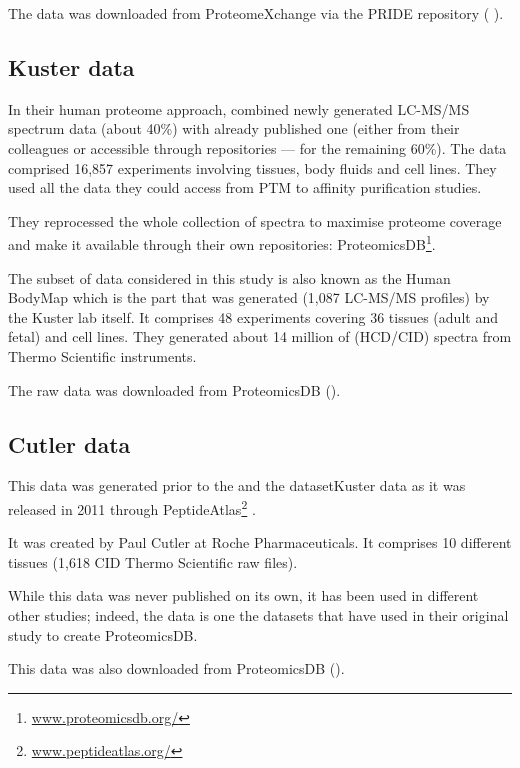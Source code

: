 The data was downloaded from ProteomeXchange via the PRIDE repository (%
).

\subsection{Kuster data}

In their human proteome approach,
\cite{KusterData} combined newly generated \gls{LC-MS/MS} spectrum
data (about 40\%) with already published one
(either from their colleagues or accessible through repositories ---
for the remaining 60\%).
The data comprised 16,857 experiments involving tissues, body fluids and cell
lines. They used all the data they could access from \gls{PTM} to affinity
purification studies.

They reprocessed the whole collection of spectra to maximise proteome coverage
and make it available through their own repositories: ProteomicsDB\footnote{%
\href{https://www.proteomicsdb.org/}{www.proteomicsdb.org/}}.

The subset of data considered in this study is also known as the Human BodyMap
which is the part that was generated (1,087 \gls{LC-MS/MS} profiles)
by the Kuster lab itself.
It comprises 48 experiments covering 36 tissues
(adult and fetal) and cell lines.
They generated about 14 million of (\gls{HCD}/\gls{CID}) spectra from Thermo
Scientific instruments.

The raw data was downloaded from ProteomicsDB ().

\subsection{Cutler data}

This data was generated prior to the  and the dataset{Kuster}
data as it was released in 2011 through PeptideAtlas\footnote{%
    \href{http://www.peptideatlas.org/}{www.peptideatlas.org/}}
\citep{PeptideAtlas}.

It was created by Paul Cutler at Roche Pharmaceuticals.
It comprises 10 different tissues (1,618 \gls{CID} Thermo Scientific raw files).

While this data was never published on its own, it has been used in different
other studies; indeed, the  data is one the datasets that
\cite{KusterData} have used in their original study to create ProteomicsDB.

This data was also downloaded from ProteomicsDB ().

